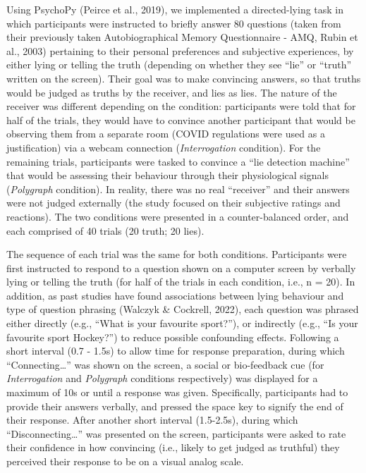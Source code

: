 \documentclass[
  man,mask,floatsintext]{apa6}
\begin{document}
Using PsychoPy (Peirce et al., 2019), we implemented a directed-lying task in which participants were instructed to briefly answer 80 questions (taken from their previously taken Autobiographical Memory Questionnaire - AMQ, Rubin et al., 2003) pertaining to their personal preferences and subjective experiences, by either lying or telling the truth (depending on whether they see ``lie'' or ``truth'' written on the screen). Their goal was to make convincing answers, so that truths would be judged as truths by the receiver, and lies as lies. The nature of the receiver was different depending on the condition: participants were told that for half of the trials, they would have to convince another participant that would be observing them from a separate room (COVID regulations were used as a justification) via a webcam connection (\emph{Interrogation} condition). For the remaining trials, participants were tasked to convince a ``lie detection machine'' that would be assessing their behaviour through their physiological signals (\emph{Polygraph} condition). In reality, there was no real ``receiver'' and their answers were not judged externally (the study focused on their subjective ratings and reactions). The two conditions were presented in a counter-balanced order, and each comprised of 40 trials (20 truth; 20 lies).

The sequence of each trial was the same for both conditions. Participants were first instructed to respond to a question shown on a computer screen by verbally lying or telling the truth (for half of the trials in each condition, i.e., n = 20). In addition, as past studies have found associations between lying behaviour and type of question phrasing (Walczyk \& Cockrell, 2022), each question was phrased either directly (e.g., ``What is your favourite sport?''), or indirectly (e.g., ``Is your favourite sport Hockey?'') to reduce possible confounding effects. Following a short interval (0.7 - 1.5s) to allow time for response preparation, during which ``Connecting\ldots{}'' was shown on the screen, a social or bio-feedback cue (for \emph{Interrogation} and \emph{Polygraph} conditions respectively) was displayed for a maximum of 10s or until a response was given. Specifically, participants had to provide their answers verbally, and pressed the space key to signify the end of their response. After another short interval (1.5-2.5s), during which ``Disconnecting\ldots{}'' was presented on the screen, participants were asked to rate their confidence in how convincing (i.e., likely to get judged as truthful) they perceived their response to be on a visual analog scale.
\end{document}
